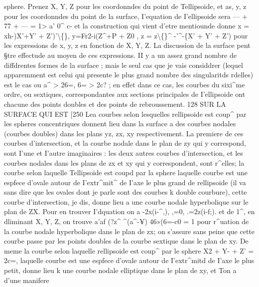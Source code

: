 \documentclass[11pt,a4paper]{book}
\begin{document}
sphere.  Prenez  X,  Y,  Z  pour  les  coordonndes  du  point  de  Tellipsoide,  et  as,  y,  z  pour
les  coordonndes  du  point  de  la  surface,  I'equation  de  I'ellipsoide  sera
— +  77  +  — =  1>
a'      0^      c-
et  la  construction  qui  vient  d'etre  mentiounde  donne
x  =  xh-^^iX'+Y'  +  Z')'\textbackslash\{\},    y=Fr2-i(Z^+P  +  Z0    ,     z  =  z\textbackslash\{\}^ -'^-\{X' +  Y' +  Z')
pour  les  expressions  de  x,  y,  z  en  fonction  de  X,  Y,  Z.
La  discussion  de  la  surface  pent  §tre  effectude  au  moyen  de  ces  expressions.  II
y  a  un  assez  grand  nombre  de  diffdrentes  formes  de  la  surface ;  mais  le  seul  cas  que
je  vais  considdrer  (lequel  apparemment  est  celui  qui  presente  le  plus  grand  nombre
des  singularitds  rdelles)  est  le  cas  ou  a^  >  26=,  6=  >  2c? ;  en  effet  dans  ce  cas,  les  courbes
du  sixi^me  ordre,  ou  sextiques,  correspondantes  aux  sections  principales  de  I'ellipsoide
ont  chacune  des  points  doubles  et  des  points  de  rebroussement.
128  SUR   LA   SURFACE   QUI    EST  [250
Lea  courbes  selon  lesquelles  rellipsoide  est  coup^  par  les  spheres  concentriques
donnent  lieu  dans  la  surface  a  des  courbes  nodales  (courbes  doubles)  dans  les  plans
yz,  zx,  xy  respectivement.  La  premiere  de  ces  courbes  d'intersection,  et  la  courbe
nodale  dans  le  plan  de  zy  qui  y  correspond,  sont  I'une  et  I'autre  imaginaires :  les  deux
autres  courbes  d'intersection,  et  les  courbes  nodales  dans  les  plans  de  zx  et  xy  qui  y
correspondent,  sont  r^elles;  la  courbe  selon  laquelle  Tellipsoide  est  coupd  par  la  sphere
laquelle  courbe  est  une  espfece  d'ovale  autour  de  I'extr^mit^  de  I'axe  le  plus  grand
de  rellipsoide  (il  va  sans  dire  que  les  ovales  dont  je  parle  sont  des  courbes  k  double
courbure),  cette  courbe  d'intersection,  je  dis,  donne  lieu  a  une  courbe  nodale  hyperbolique
sur  le  plan  de  ZX.     Pour  en  trouver  I'dquation  on  a
-2x(i-^,),    ,=0,   .=2z(i-f;).
et  de  1^,  en  dliminant  X,  Y,  Z,  on  trouve
a'af  (?z^
^(a^-¥)     46»(6=-c0
=  1
pour  r^uation  de  la  courbe  nodale  hyperbolique  dans  le  plan  de  zx;  on  s'assure  sans
peine  que  cette  courbe  passe  par  les  points  doubles  de  la  courbe  sextique  dans  le
plan   de  xy.
De  meme  la  courbe  selon  laquelle  rellipsoide  est  coup^  par  le  sphere
X2  +  Y-  +  Z'  =  2c=,
laquelle  courbe  est  une  espfece  d'ovale  autour  de  I'extr^mitd  de  I'axe  le  plus  petit,
donne  lieu  k  une  courbe  nodale  elliptique  dans  le  plan  de  xy,  et  Ton  a  d'une  manifere
\end{document}
